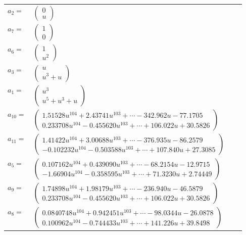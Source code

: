 \documentclass[1p]{elsarticle_modified}
\theoremstyle{definition}
\begin{document}
\begin{tabular}{m{7pt} m{180pt} m{7pt} m{180pt} }
\flushright $a_{2}=$&$\begin{pmatrix}0\\u\end{pmatrix}$ \\
\flushright $a_{7}=$&$\begin{pmatrix}1\\0\end{pmatrix}$ \\
\flushright $a_{6}=$&$\begin{pmatrix}1\\u^2\end{pmatrix}$ \\
\flushright $a_{3}=$&$\begin{pmatrix}u\\u^3+u\end{pmatrix}$ \\
\flushright $a_{1}=$&$\begin{pmatrix}u^3\\u^5+u^3+u\end{pmatrix}$ \\
\flushright $a_{10}=$&$\begin{pmatrix}1.51528 u^{104}+2.43741 u^{103}+\cdots-342.962 u-77.1705\\0.233708 u^{104}-0.455620 u^{103}+\cdots+106.022 u+30.5826\end{pmatrix}$ \\
\flushright $a_{11}=$&$\begin{pmatrix}1.41422 u^{104}+3.00688 u^{103}+\cdots-376.935 u-86.2579\\-0.102232 u^{104}-0.503588 u^{103}+\cdots+107.840 u+27.3085\end{pmatrix}$ \\
\flushright $a_{5}=$&$\begin{pmatrix}0.107162 u^{104}+0.439090 u^{103}+\cdots-68.2154 u-12.9715\\-1.66904 u^{104}-0.358595 u^{103}+\cdots+71.3230 u+2.74449\end{pmatrix}$ \\
\flushright $a_{9}=$&$\begin{pmatrix}1.74898 u^{104}+1.98179 u^{103}+\cdots-236.940 u-46.5879\\0.233708 u^{104}-0.455620 u^{103}+\cdots+106.022 u+30.5826\end{pmatrix}$ \\
\flushright $a_{8}=$&$\begin{pmatrix}0.0840748 u^{104}+0.942451 u^{103}+\cdots-98.0344 u-26.0878\\0.100962 u^{104}-0.744433 u^{103}+\cdots+141.226 u+39.8498\end{pmatrix}$ \\

\end{tabular}
\end{document}
